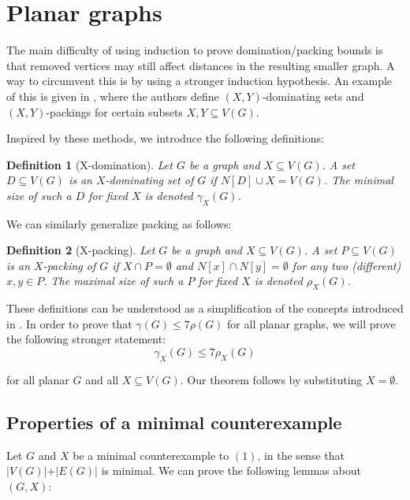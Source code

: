 \documentclass[a4paper, 12pt]{article}
\newtheorem{definition}{Definition}
\begin{document}
\newpage
\section{Planar graphs}

The main difficulty of using induction to prove domination/packing bounds is that removed vertices may still affect distances in the resulting smaller graph. A way to circumvent this is by using a stronger induction hypothesis. An example of this is given in \cite{bonamy2025graph}, where the authors define $(X,Y)$-dominating sets and $(X,Y)$-packings for certain subsets $X, Y \subseteq V(G)$. 

Inspired by these methods, we introduce the following definitions:

\begin{definition}[X-domination]
    Let $G$ be a graph and $X \subseteq V(G)$. A set $D\subseteq V(G)$ is an $X$-dominating set of $G$ if $N[D]\cup X = V(G)$. The minimal size of such a $D$ for fixed $X$ is denoted $\gamma_X(G)$.
\end{definition}

We can similarly generalize packing as follows:
\begin{definition}[X-packing]
    Let $G$ be a graph and $X \subseteq V(G)$. A set $P\subseteq V(G)$ is an $X$-packing of $G$ if $X \cap P = \emptyset$ and $N[x] \cap N[y] = \emptyset$ for any two (different) $x, y \in P$. The maximal size of such a $P$ for fixed $X$ is denoted $\rho_X(G)$.
\end{definition}

These definitions can be understood as a simplification of the concepts introduced in \cite{bonamy2025graph}.
In order to prove that $\gamma(G) \leq 7\rho(G)$ for all planar graphs, we will prove the following stronger statement:
\begin{equation}
 \gamma_X(G) \leq 7\rho_X(G)  
\end{equation}

for all planar $G$ and all $X\subseteq V(G)$. Our theorem follows by substituting $X=\emptyset$.


\subsection{Properties of a minimal counterexample}
Let $G$ and $X$ be a minimal counterexample to $(1)$, in the sense that $\vert V(G)\vert + \vert E(G)\vert$ is minimal. We can prove the following lemmas about $(G, X)$:
\end{document}
